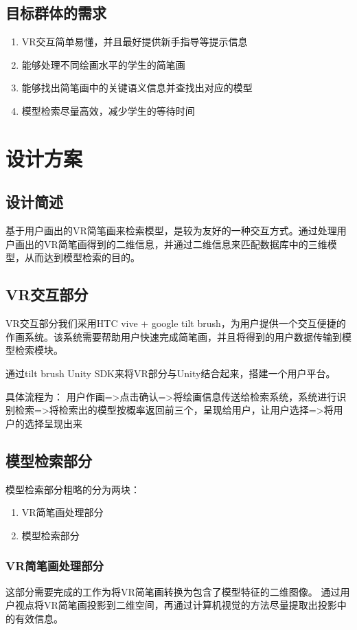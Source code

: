 \documentclass{article}
\begin{document}
\subsection{目标群体的需求}
\begin{enumerate}
    \item VR交互简单易懂，并且最好提供新手指导等提示信息
    \item 能够处理不同绘画水平的学生的简笔画
    \item 能够找出简笔画中的关键语义信息并查找出对应的模型
    \item 模型检索尽量高效，减少学生的等待时间
\end{enumerate}

\section{设计方案}
\subsection{设计简述}
基于用户画出的VR简笔画来检索模型，是较为友好的一种交互方式。通过处理用户画出的VR简笔画得到的二维信息，并通过二维信息来匹配数据库中的三维模型，从而达到模型检索的目的。  

\subsection{VR交互部分}
VR交互部分我们采用HTC vive + google tilt brush，为用户提供一个交互便捷的作画系统。该系统需要帮助用户快速完成简笔画，并且将得到的用户数据传输到模型检索模块。

通过tilt brush Unity SDK来将VR部分与Unity结合起来，搭建一个用户平台。

具体流程为：
用户作画=>点击确认=>将绘画信息传送给检索系统，系统进行识别检索=>将检索出的模型按概率返回前三个，呈现给用户，让用户选择=>将用户的选择呈现出来

\subsection{模型检索部分}
模型检索部分粗略的分为两块：
\begin{enumerate}
    \item VR简笔画处理部分
    \item 模型检索部分
\end{enumerate}

\subsubsection{VR简笔画处理部分}
这部分需要完成的工作为将VR简笔画转换为包含了模型特征的二维图像。 
通过用户视点将VR简笔画投影到二维空间，再通过计算机视觉的方法尽量提取出投影中的有效信息。
\end{document}
